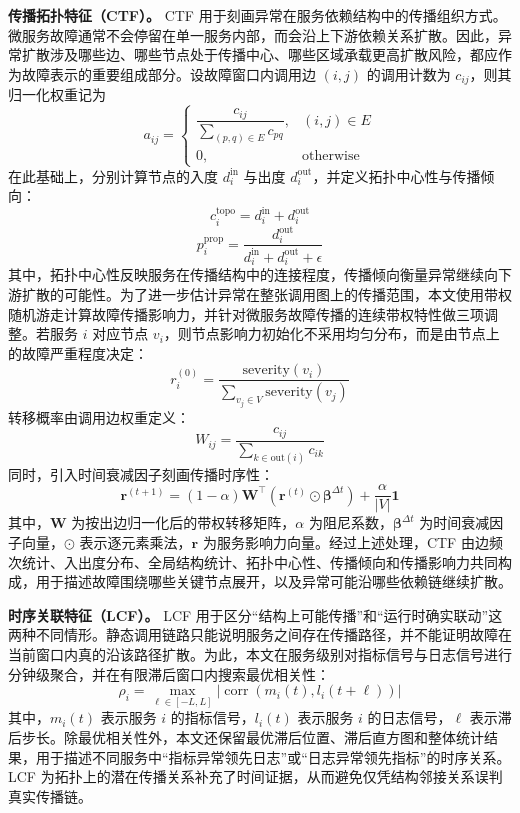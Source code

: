 \textbf{传播拓扑特征（CTF）。}
CTF 用于刻画异常在服务依赖结构中的传播组织方式。微服务故障通常不会停留在单一服务内部，而会沿上下游依赖关系扩散。因此，异常扩散涉及哪些边、哪些节点处于传播中心、哪些区域承载更高扩散风险，都应作为故障表示的重要组成部分。设故障窗口内调用边 $(i,j)$ 的调用计数为 $c_{ij}$，则其归一化权重记为
\begin{equation}
a_{ij}=
\begin{cases}
\dfrac{c_{ij}}{\sum_{(p,q)\in E} c_{pq}}, & (i,j)\in E \\
0, & \text{otherwise}
\end{cases}
\end{equation}
在此基础上，分别计算节点的入度 $d_i^{\text{in}}$ 与出度 $d_i^{\text{out}}$，并定义拓扑中心性与传播倾向：
\begin{equation}
c_i^{\text{topo}} = d_i^{\text{in}} + d_i^{\text{out}}
\end{equation}
\begin{equation}
p_i^{\text{prop}} = \frac{d_i^{\text{out}}}{d_i^{\text{in}} + d_i^{\text{out}} + \epsilon}
\end{equation}
其中，拓扑中心性反映服务在传播结构中的连接程度，传播倾向衡量异常继续向下游扩散的可能性。为了进一步估计异常在整张调用图上的传播范围，本文使用带权随机游走计算故障传播影响力，并针对微服务故障传播的连续带权特性做三项调整。若服务 $i$ 对应节点 $v_i$，则节点影响力初始化不采用均匀分布，而是由节点上的故障严重程度决定：
\begin{equation}
r_i^{(0)} = \frac{\text{severity}(v_i)}{\sum_{v_j \in V} \text{severity}(v_j)}
\end{equation}
转移概率由调用边权重定义：
\begin{equation}
W_{ij} = \frac{c_{ij}}{\sum_{k \in \text{out}(i)} c_{ik}}
\end{equation}
同时，引入时间衰减因子刻画传播时序性：
\begin{equation}
\mathbf{r}^{(t+1)} = (1-\alpha) \mathbf{W}^{\top}(\mathbf{r}^{(t)} \odot \boldsymbol{\beta}^{\Delta t}) + \frac{\alpha}{|V|}\mathbf{1}
\end{equation}
其中，$\mathbf{W}$ 为按出边归一化后的带权转移矩阵，$\alpha$ 为阻尼系数，$\boldsymbol{\beta}^{\Delta t}$ 为时间衰减因子向量，$\odot$ 表示逐元素乘法，$\mathbf{r}$ 为服务影响力向量。经过上述处理，CTF 由边频次统计、入出度分布、全局结构统计、拓扑中心性、传播倾向和传播影响力共同构成，用于描述故障围绕哪些关键节点展开，以及异常可能沿哪些依赖链继续扩散。

\textbf{时序关联特征（LCF）。}
LCF 用于区分“结构上可能传播”和“运行时确实联动”这两种不同情形。静态调用链路只能说明服务之间存在传播路径，并不能证明故障在当前窗口内真的沿该路径扩散。为此，本文在服务级别对指标信号与日志信号进行分钟级聚合，并在有限滞后窗口内搜索最优相关性：
\begin{equation}
\rho_i = \max_{\ell \in [-L,L]} \left|\operatorname{corr}\left(m_i(t), l_i(t+\ell)\right)\right|
\end{equation}
其中，$m_i(t)$ 表示服务 $i$ 的指标信号，$l_i(t)$ 表示服务 $i$ 的日志信号，$\ell$ 表示滞后步长。除最优相关性外，本文还保留最优滞后位置、滞后直方图和整体统计结果，用于描述不同服务中“指标异常领先日志”或“日志异常领先指标”的时序关系。LCF 为拓扑上的潜在传播关系补充了时间证据，从而避免仅凭结构邻接关系误判真实传播链。

